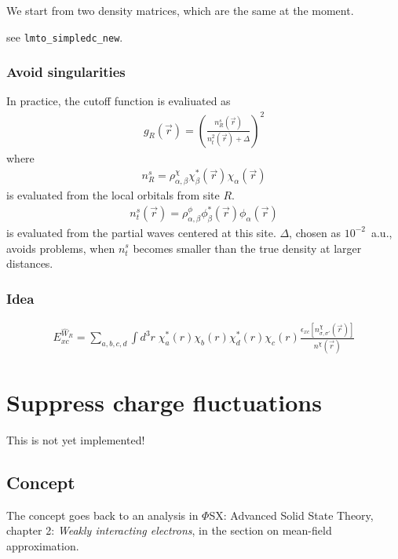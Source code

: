 \documentclass[11pt,a4paper]{report}
\begin{document}
We start from two density matrices, which are the same at the moment.

see \verb|lmto_simpledc_new|.

\subsubsection{Avoid singularities}
In practice, the cutoff function is evaliuated as 
\begin{eqnarray}
g_{R}(\vec{r})=\left(\frac{n^s_R(\vec{r})}{n_t^2(\vec{r})+\Delta}\right)^2
\end{eqnarray}
where
\begin{eqnarray}
n^s_R=\rho^{\chi}_{\alpha,\beta}\chi_\beta^*(\vec{r})\chi_{\alpha}(\vec{r})
\end{eqnarray}
 is evaluated from the local orbitals from site $R$.
\begin{eqnarray}
n^s_t(\vec{r})=\rho^{\phi}_{\alpha,\beta}\phi_\beta^*(\vec{r})\phi_{\alpha}(\vec{r})
\end{eqnarray}
is evaluated from the partial waves centered at this
site. $\Delta$, chosen as $10^{-2}$~a.u., avoids problems, when
$n^s_t$ becomes smaller than the true density at larger distances.


\subsubsection{Idea}
\begin{eqnarray}
E_{xc}^{\hat{W}_R}=\sum_{a,b,c,d}\int d^3r\; 
\chi^*_a(r)\chi_b(r)\chi^*_d(r)\chi_c(r)
\frac{\epsilon_{xc}[n^\chi_{\sigma,\sigma'}(\vec{r})]}
{n^\chi(\vec{r})}
\end{eqnarray}

\section{Suppress charge fluctuations}
This is not yet implemented!

\subsection{Concept}
The concept goes back to an analysis in $\Phi$SX: Advanced Solid State
Theory, chapter 2: \textit{Weakly interacting electrons}, in the
section on mean-field approximation.
\end{document}

